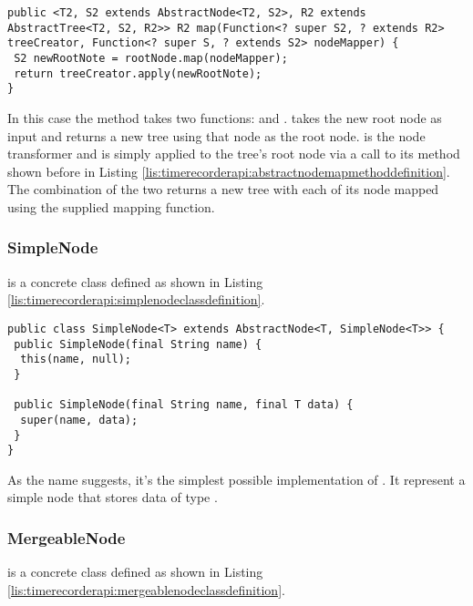 \begin{lstlisting}[breaklines,caption={AbstractTree map method definition},label=lis:timerecorderapi:abstracttreemapmethoddefinition]
public <T2, S2 extends AbstractNode<T2, S2>, R2 extends AbstractTree<T2, S2, R2>> R2 map(Function<? super S2, ? extends R2> treeCreator, Function<? super S, ? extends S2> nodeMapper) {
 S2 newRootNote = rootNode.map(nodeMapper);
 return treeCreator.apply(newRootNote);
}
\end{lstlisting}

\noindent In this case the method takes two functions:  and .  takes the new root node as input and returns a new tree using that node as the root node.  is the node transformer and is simply applied to the tree's root node via a call to its  method shown before in Listing \ref{lis:timerecorderapi:abstractnodemapmethoddefinition}. The combination of the two returns a new tree with each of its node mapped using the supplied mapping function.

\subsubsection{SimpleNode}

 is a concrete class defined as shown in Listing \ref{lis:timerecorderapi:simplenodeclassdefinition}.

\begin{lstlisting}[breaklines,caption={SimpleNode class definition},label=lis:timerecorderapi:simplenodeclassdefinition]
public class SimpleNode<T> extends AbstractNode<T, SimpleNode<T>> {
 public SimpleNode(final String name) {
  this(name, null);
 }

 public SimpleNode(final String name, final T data) {
  super(name, data);
 }
}
\end{lstlisting}

\noindent As the name suggests, it's the simplest possible implementation of . It represent a simple node that stores data of type .

\subsubsection{MergeableNode}

 is a concrete class defined as shown in Listing \ref{lis:timerecorderapi:mergeablenodeclassdefinition}.

